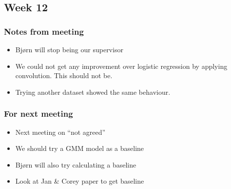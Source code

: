 
\subsection{Week 12}

\subsubsection{Notes from meeting}

\begin{itemize}
\item Bjørn will stop being our supervisor
\item We could not get any improvement over logistic regression by applying convolution. This should not be.
\item Trying another dataset showed the same behaviour.
\end{itemize}

\subsubsection{For next meeting}

\begin{itemize}
\item Next meeting on ``not agreed''
\item We should try a GMM model as a baseline
\item Bjørn will also try calculating a baseline
\item Look at Jan \& Corey paper to get baseline
\end{itemize}

